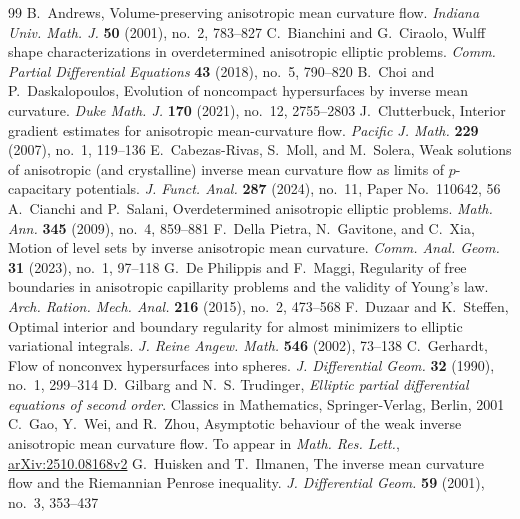 \documentclass[10pt,a4paper]{amsart}
\providecommand{\arxiv}[1]{\href{https://arxiv.org/abs/#1}{arXiv:#1}}
\numberwithin{equation}{section}
\begin{document}
\begin{thebibliography}{99}
 B.~Andrews, Volume-preserving anisotropic mean curvature flow. \emph{Indiana Univ. Math. J.} \textbf{50} (2001), no.~2, 783--827 
 C.~Bianchini and G.~Ciraolo, Wulff shape characterizations in overdetermined anisotropic elliptic problems. \emph{Comm. Partial Differential Equations} \textbf{43} (2018), no.~5, 790--820 
 B.~Choi and P.~Daskalopoulos, Evolution of noncompact hypersurfaces by inverse mean curvature. \emph{Duke Math. J.} \textbf{170} (2021), no.~12, 2755--2803 
 J.~Clutterbuck, Interior gradient estimates for anisotropic mean-curvature flow. \emph{Pacific J. Math.} \textbf{229} (2007), no.~1, 119--136 
 E.~Cabezas-Rivas, S.~Moll, and M.~Solera, Weak solutions of anisotropic (and crystalline) inverse mean curvature flow as limits of $p$-capacitary potentials. \emph{J. Funct. Anal.} \textbf{287} (2024), no.~11, Paper No.~110642, 56 
 A.~Cianchi and P.~Salani, Overdetermined anisotropic elliptic problems. \emph{Math. Ann.} \textbf{345} (2009), no.~4, 859--881 
 F.~Della Pietra, N.~Gavitone, and C.~Xia, Motion of level sets by inverse anisotropic mean curvature. \emph{Comm. Anal. Geom.} \textbf{31} (2023), no.~1, 97--118 
 G.~De Philippis and F.~Maggi, Regularity of free boundaries in anisotropic capillarity problems and the validity of Young's law. \emph{Arch. Ration. Mech. Anal.} \textbf{216} (2015), no.~2, 473--568 %
 F.~Duzaar and K.~Steffen, Optimal interior and boundary regularity for almost minimizers to elliptic variational integrals. \emph{J. Reine Angew. Math.} \textbf{546} (2002), 73--138 
 C.~Gerhardt, Flow of nonconvex hypersurfaces into spheres. \emph{J. Differential Geom.} \textbf{32} (1990), no.~1, 299--314 
 D.~Gilbarg and N.~S. Trudinger, \emph{Elliptic partial differential equations of second order}. Classics in Mathematics, Springer-Verlag, Berlin, 2001
 C.~Gao, Y.~Wei, and R.~Zhou, Asymptotic behaviour of the weak inverse anisotropic mean curvature flow. To appear in \emph{Math. Res. Lett.}, \arxiv{2510.08168v2}
 G.~Huisken and T.~Ilmanen, The inverse mean curvature flow and the Riemannian Penrose inequality. \emph{J. Differential Geom.} \textbf{59} (2001), no.~3, 353--437 

\end{thebibliography}
\end{document}
